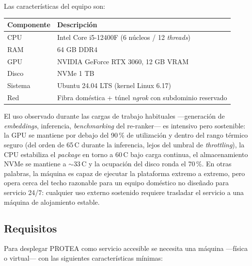 \documentclass[11pt,a4paper]{article}
\begin{document}
Las características del equipo son:

\begin{center}
\begin{tabular}{ll}
\toprule
\textbf{Componente} & \textbf{Descripción} \\
\midrule
CPU     & Intel Core i5-12400F (6 núcleos / 12 \emph{threads}) \\
RAM     & 64 GB DDR4 \\
GPU     & NVIDIA GeForce RTX 3060, 12 GB VRAM \\
Disco   & NVMe 1 TB \\
Sistema & Ubuntu 24.04 LTS (kernel Linux 6.17) \\
Red     & Fibra doméstica + túnel \emph{ngrok} con subdominio reservado \\
\bottomrule
\end{tabular}
\end{center}

El uso observado durante las cargas de trabajo habituales —generación de
\emph{embeddings}, inferencia, \emph{benchmarking} del re-ranker— es
intensivo pero sostenible: la GPU se mantiene por debajo del 90\,\% de
utilización y dentro del rango térmico seguro (del orden de
65\,\textdegree{}C durante la inferencia, lejos del umbral de \emph{throttling}),
la CPU estabiliza el \emph{package} en torno a 60\,\textdegree{}C bajo carga
continua, el almacenamiento NVMe se mantiene a $\sim$33\,\textdegree{}C y la
ocupación del disco ronda el 70\,\%. En otras palabras, la máquina es
capaz de ejecutar la plataforma extremo a extremo, pero opera cerca del
techo razonable para un equipo doméstico no diseñado para servicio 24/7:
cualquier uso externo sostenido requiere trasladar el servicio a una
máquina de alojamiento estable.

\subsection{Requisitos}

Para desplegar PROTEA como servicio accesible se necesita una máquina
—física o virtual— con las siguientes características mínimas:
\end{document}

